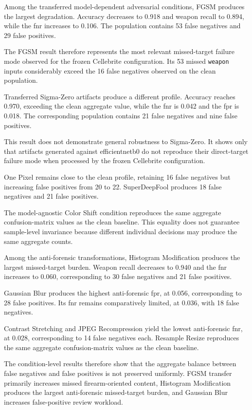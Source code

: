 Among the transferred model-dependent adversarial conditions, FGSM produces the
largest degradation. Accuracy decreases to 0.918 and weapon recall to 0.894,
while the \gls{fnr} increases to 0.106. The population contains 53 false
negatives and 29 false positives.

The FGSM result therefore represents the most relevant missed-target failure
mode observed for the frozen Cellebrite configuration. Its 53 missed
\texttt{weapon} inputs considerably exceed the 16 false negatives observed on
the clean population.

Transferred Sigma-Zero artifacts produce a different profile. Accuracy reaches
0.970, exceeding the clean aggregate value, while the \gls{fnr} is 0.042 and
the \gls{fpr} is 0.018. The corresponding population contains 21 false
negatives and nine false positives.

This result does not demonstrate general robustness to Sigma-Zero. It shows
only that artifacts generated against \gls{efficientnetb0} do not reproduce their
direct-target failure mode when processed by the frozen Cellebrite
configuration.

One Pixel remains close to the clean profile, retaining 16 false negatives but
increasing false positives from 20 to 22. SuperDeepFool produces 18 false
negatives and 21 false positives.

The model-agnostic Color Shift condition reproduces the same aggregate
confusion-matrix values as the clean baseline. This equality does not guarantee
sample-level invariance because different individual decisions may produce the
same aggregate counts.

Among the anti-forensic transformations, Histogram Modification produces the
largest missed-target burden. Weapon recall decreases to 0.940 and the
\gls{fnr} increases to 0.060, corresponding to 30 false negatives and 21 false
positives.

Gaussian Blur produces the highest anti-forensic \gls{fpr}, at 0.056,
corresponding to 28 false positives. Its \gls{fnr} remains comparatively
limited, at 0.036, with 18 false negatives.

Contrast Stretching and JPEG Recompression yield the lowest anti-forensic
\gls{fnr}, at 0.028, corresponding to 14 false negatives each. Resample Resize
reproduces the same aggregate confusion-matrix values as the clean baseline.

The condition-level results therefore show that the aggregate balance between
false negatives and false positives is not preserved uniformly. FGSM transfer
primarily increases missed firearm-oriented content, Histogram Modification
produces the largest anti-forensic missed-target burden, and Gaussian Blur
increases false-positive review workload.


